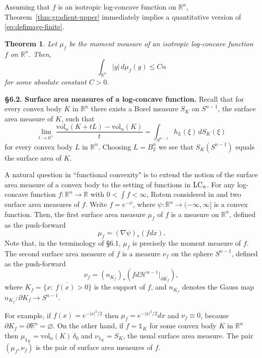 \documentclass[11pt,leqno]{article}
\newtheorem{theorem}{Theorem}[section]
\theoremstyle{definition}
\theoremstyle{remark}
\numberwithin{equation}{section}
\newcommand{\ls}{\leqslant}
\newcommand{\1}{\textbf{1}}
\newcommand{\vol}{\mathrm{vol}}
\begin{document}
Assuming that $f$ is an isotropic log-concave function on $\mathbb{R}^n$, Theorem~\ref{thm:gradient-upper} immediately implies a quantitative version
of \eqref{eq:defimage-finite}.

\begin{theorem}\label{th:moment-mu-f}Let $\mu_f$ be the moment measure of an isotropic log-concave function $f$ on $\mathbb{R}^n$.
Then,
$$\int_{\mathbb{R}^n} |y| \, d\mu_f(y)\ls Cn$$
for some absolute constant $C>0$.
\end{theorem}


\bigskip 

\noindent \textbf{\S 6.2. Surface area measures of a log-concave function.} Recall that for every convex body $K$ in $\mathbb{R}^n$ there exists 
a Borel measure $S_K$ on $S^{n-1}$, the surface area measure of $K$, such that
\begin{equation}\label{eq:surface-area-measure}\lim_{t\to 0^+}\frac{\vol_n(K+tL)-\vol_n(K)}{t}=\int_{S^{n-1}}h_L(\xi)\,dS_K(\xi)\end{equation}
for every convex body $L$ in $\mathbb{R}^n$. Choosing $L=B_2^n$ we see that $S_K(S^{n-1})$ equals the surface area of $K$.

A natural question in ``functional convexity" is to extend the notion of the surface area measure of a convex body to the setting
of functions in ${\rm LC}_n$. For any log-concave function $f:\mathbb{R}^{n}\to\mathbb{R}$ with $0<\int f<\infty$, Rotem considered 
in \cite{Rotem-2022} and \cite{Rotem-2023} two surface area measures of $f$. Write $f=e^{-\psi}$, where $\psi:\mathbb{R}^{n}\to(-\infty,\infty]$ 
is a convex function. Then, the first surface area measure $\mu_{f}$ of $f$ is a measure on $\mathbb{R}^{n}$, defined as the push-forward
$$\mu_{f}=(\nabla\psi)_{\ast}(fdx).$$
Note that, in the terminology of \S 6.1, $\mu_f$ is precisely the moment measure of $f$. The second surface area measure of $f$ is a measure $\nu_{f}$
on the sphere $S^{n-1}$, defined as the push-forward 
$$\nu_{f}=(n_{K_{f}})_{\ast}(fd\mathcal{H}^{n-1}|_{\partial K_{f}}),$$
where $K_{f}=\overline{\{ x:\ f(x)>0\}}$ is the support of $f$, and $n_{K_{f}}$ denotes the Gauss map $n_{K_{f}}:\partial K_{f}\to S^{n-1}$. 

For example, if $f(x)=e^{-|x|^{2}/2}$ then $\mu_{f}=e^{-|x|^{2}/2}dx$ and $\nu_{f}\equiv 0$, because $\partial K_{f}=\partial\mathbb{R}^{n}=\varnothing$.
On the other hand, if $f=\mathds{1}_K$ for some convex body $K$ in $\mathbb{R}^n$ then $\mu_{\mathds{1}_{K}}=\vol_n(K)\,\delta_{0}$ 
and $\nu_{\mathds{1}_{K}}=S_{K}$, the usual surface area measure. The pair $(\mu_{f},\nu_{f})$ is the pair of
surface area measures of $f$. 
\end{document}
